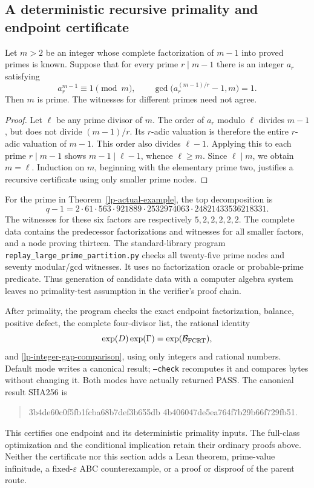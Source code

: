 \subsection{A deterministic recursive primality and endpoint certificate}

\begin{lemma}
\label{lp-lucas-criterion}
Let \(m>2\) be an integer whose complete factorization of \(m-1\)
into proved primes is known. Suppose that for every prime
\(r\mid m-1\) there is an integer \(a_r\) satisfying
\[
 a_r^{m-1}\equiv1\pmod m,\qquad
 \gcd\bigl(a_r^{(m-1)/r}-1,m\bigr)=1.
\]
Then \(m\) is prime. The witnesses for different primes need not agree.
\end{lemma}
\begin{proof}
Let \(\ell\) be any prime divisor of \(m\). The order of \(a_r\)
modulo \(\ell\) divides \(m-1\), but does not divide \((m-1)/r\).
Its \(r\)-adic valuation is therefore the entire \(r\)-adic valuation
of \(m-1\). This order also divides \(\ell-1\). Applying this to
each prime \(r\mid m-1\) shows \(m-1\mid\ell-1\), whence
\(\ell\ge m\). Since \(\ell\mid m\), we obtain \(m=\ell\).
Induction on \(m\), beginning with the elementary prime two,
justifies a recursive certificate using only smaller prime nodes.
\end{proof}

For the prime in Theorem~\ref{lp-actual-example}, the top decomposition is
\[
 q-1=2\cdot61\cdot563\cdot921889\cdot2532974063
             \cdot24821433536218331.
\]
The witnesses for these six factors are respectively \(5,2,2,2,2,2\).
The complete data contains the predecessor factorizations and witnesses
for all smaller factors, and a node proving thirteen. The standard-library
program \texttt{replay\_large\_prime\_partition.py} checks all twenty-five
prime nodes and seventy modular/gcd witnesses. It uses no factorization
oracle or probable-prime predicate. Thus generation of candidate data
with a computer algebra system leaves no primality-test assumption in
the verifier's proof chain.

After primality, the program checks the exact endpoint factorization,
balance, positive defect, the complete four-divisor list, the rational
identity
\[
 \exp(D)\exp(\Gamma)=\exp(\mathcal B_{\rm FCRT}),
\]
and \eqref{lp-integer-gap-comparison}, using only integers and rational
numbers. Default mode writes a canonical result; \texttt{--check}
recomputes it and compares bytes without changing it. Both modes
have actually returned PASS. The canonical result SHA256 is
\begin{quote}\ttfamily
3b4de60c0f5fb1fc\allowbreak ba68b7def3b655db\allowbreak
4b406047de5ea764\allowbreak f7b29b66f729fb51.
\end{quote}
This certifies one endpoint and its deterministic primality inputs.
The full-class optimization and the conditional implication retain
their ordinary proofs above. Neither the certificate nor this section
adds a Lean theorem, prime-value infinitude, a fixed-\(\varepsilon\)
ABC counterexample, or a proof or disproof of the parent route.
